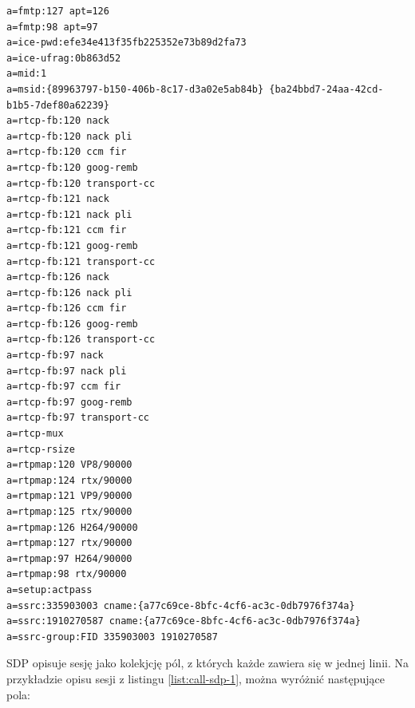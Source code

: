 \begin{lstlisting}[label=list:call-sdp-1, caption=Opis oferty połączenia SDP,
basicstyle=\footnotesize \ttfamily, showtabs=true, tabsize=4]
a=fmtp:127 apt=126
a=fmtp:98 apt=97
a=ice-pwd:efe34e413f35fb225352e73b89d2fa73
a=ice-ufrag:0b863d52
a=mid:1
a=msid:{89963797-b150-406b-8c17-d3a02e5ab84b} {ba24bbd7-24aa-42cd-b1b5-7def80a62239}
a=rtcp-fb:120 nack
a=rtcp-fb:120 nack pli
a=rtcp-fb:120 ccm fir
a=rtcp-fb:120 goog-remb
a=rtcp-fb:120 transport-cc
a=rtcp-fb:121 nack
a=rtcp-fb:121 nack pli
a=rtcp-fb:121 ccm fir
a=rtcp-fb:121 goog-remb
a=rtcp-fb:121 transport-cc
a=rtcp-fb:126 nack
a=rtcp-fb:126 nack pli
a=rtcp-fb:126 ccm fir
a=rtcp-fb:126 goog-remb
a=rtcp-fb:126 transport-cc
a=rtcp-fb:97 nack
a=rtcp-fb:97 nack pli
a=rtcp-fb:97 ccm fir
a=rtcp-fb:97 goog-remb
a=rtcp-fb:97 transport-cc
a=rtcp-mux
a=rtcp-rsize
a=rtpmap:120 VP8/90000
a=rtpmap:124 rtx/90000
a=rtpmap:121 VP9/90000
a=rtpmap:125 rtx/90000
a=rtpmap:126 H264/90000
a=rtpmap:127 rtx/90000
a=rtpmap:97 H264/90000
a=rtpmap:98 rtx/90000
a=setup:actpass
a=ssrc:335903003 cname:{a77c69ce-8bfc-4cf6-ac3c-0db7976f374a}
a=ssrc:1910270587 cname:{a77c69ce-8bfc-4cf6-ac3c-0db7976f374a}
a=ssrc-group:FID 335903003 1910270587
\end{lstlisting}

\cite{rfc8866} SDP opisuje sesję jako kolekjcję pól, z których każde zawiera się w jednej linii. Na przykładzie opisu
sesji z listingu \ref{list:call-sdp-1}, można wyróżnić następujące pola:

